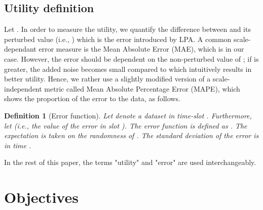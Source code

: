 \documentclass[11pt,a4paper]{article}
\theoremstyle{plain}
\newtheorem{definition}{Definition}
\theoremstyle{plain}
\theoremstyle{plain}
\theoremstyle{plain}
\theoremstyle{nonumberplain} \theoremseparator{}
\begin{document}
\subsection{Utility definition}
Let .
In order to measure the utility, we quantify the difference between  and its perturbed value (i.e., ) which is the error introduced by LPA. A common scale-dependant error measure is the Mean Absolute Error (MAE), which is 
 in our case.
However, the error should be dependent on the non-perturbed value of ; if
 is greater, the added noise becomes
small compared to  which intuitively results in better utility. Hence, we rather use a slightly
modified version of a scale-independent metric called Mean Absolute Percentage Error (MAPE), which shows the proportion of the error to the data, as follows.

\begin{definition}[Error function]
\label{def:utility}
Let  denote a dataset in time-slot .
Furthermore, let  (i.e., the value of the error in slot ). The error function is defined 
as . The expectation is taken on the randomness of . 
The standard deviation of the error is  in time . 
\end{definition}




In the rest of this paper, the terms "utility" and "error" are used interchangeably.



\section{Objectives}
\end{document}
